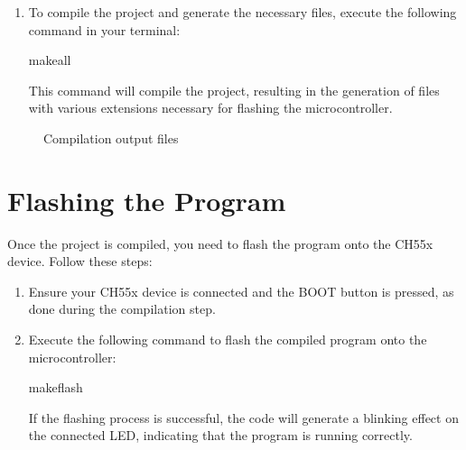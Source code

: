 \documentclass[letterpaper,10pt,english]{sphinxmanual}
\begin{document}
\begin{enumerate}
\item {} 
\sphinxAtStartPar
{}

\sphinxAtStartPar
To compile the project and generate the necessary files, execute the following command in your terminal:

\begin{sphinxVerbatim}[commandchars=\\\{\}]
makeall
\end{sphinxVerbatim}

\sphinxAtStartPar
This command will compile the project, resulting in the generation of files with various extensions necessary for flashing the microcontroller.

\end{enumerate}

\begin{figure}[htbp]
\centering
\capstart

\noindent{}
\caption{Compilation output files}\label{\detokenize{compile:id2}}\label{\detokenize{compile:files}}\end{figure}


\section{Flashing the Program}
\label{\detokenize{compile:flashing-the-program}}
\sphinxAtStartPar
Once the project is compiled, you need to flash the program onto the CH55x device. Follow these steps:
\begin{enumerate}
%
\item {} 
\sphinxAtStartPar
{}

\sphinxAtStartPar
Ensure your CH55x device is connected and the BOOT button is pressed, as done during the compilation step.

\item {} 
\sphinxAtStartPar
{}

\sphinxAtStartPar
Execute the following command to flash the compiled program onto the microcontroller:

\begin{sphinxVerbatim}[commandchars=\\\{\}]
makeflash
\end{sphinxVerbatim}

\sphinxAtStartPar
If the flashing process is successful, the code will generate a blinking effect on the connected LED, indicating that the program is running correctly.

\end{enumerate}
\end{document}
